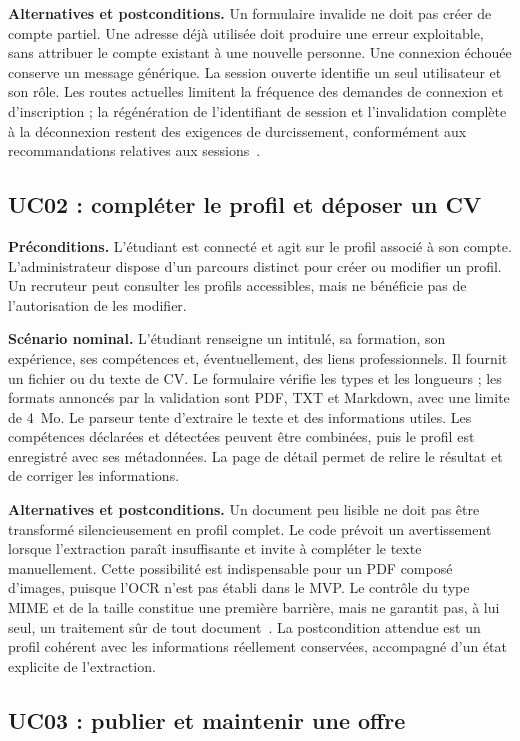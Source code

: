 \textbf{Alternatives et postconditions.} Un formulaire invalide ne doit pas créer de compte partiel. Une adresse déjà utilisée doit produire une erreur exploitable, sans attribuer le compte existant à une nouvelle personne. Une connexion échouée conserve un message générique. La session ouverte identifie un seul utilisateur et son rôle. Les routes actuelles limitent la fréquence des demandes de connexion et d'inscription ; la régénération de l'identifiant de session et l'invalidation complète à la déconnexion restent des exigences de durcissement, conformément aux recommandations relatives aux sessions~\cite{owasp-session}.

\subsection{UC02 : compléter le profil et déposer un CV}

\textbf{Préconditions.} L'étudiant est connecté et agit sur le profil associé à son compte. L'administrateur dispose d'un parcours distinct pour créer ou modifier un profil. Un recruteur peut consulter les profils accessibles, mais ne bénéficie pas de l'autorisation de les modifier.

\textbf{Scénario nominal.} L'étudiant renseigne un intitulé, sa formation, son expérience, ses compétences et, éventuellement, des liens professionnels. Il fournit un fichier ou du texte de CV. Le formulaire vérifie les types et les longueurs ; les formats annoncés par la validation sont PDF, TXT et Markdown, avec une limite de 4~Mo. Le parseur tente d'extraire le texte et des informations utiles. Les compétences déclarées et détectées peuvent être combinées, puis le profil est enregistré avec ses métadonnées. La page de détail permet de relire le résultat et de corriger les informations.

\textbf{Alternatives et postconditions.} Un document peu lisible ne doit pas être transformé silencieusement en profil complet. Le code prévoit un avertissement lorsque l'extraction paraît insuffisante et invite à compléter le texte manuellement. Cette possibilité est indispensable pour un PDF composé d'images, puisque l'OCR n'est pas établi dans le MVP. Le contrôle du type MIME et de la taille constitue une première barrière, mais ne garantit pas, à lui seul, un traitement sûr de tout document~\cite{owasp-upload}. La postcondition attendue est un profil cohérent avec les informations réellement conservées, accompagné d'un état explicite de l'extraction.

\subsection{UC03 : publier et maintenir une offre}

